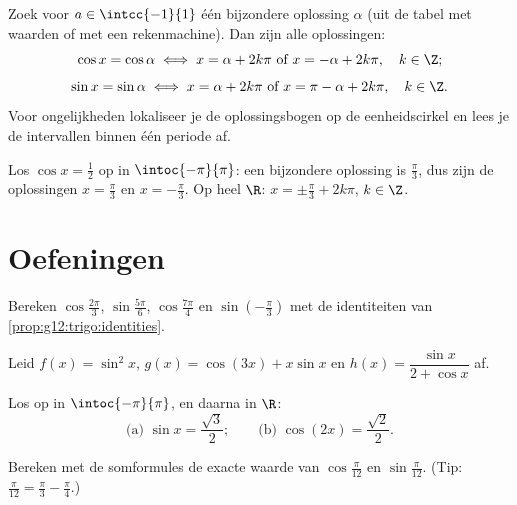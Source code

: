 \begin{method}[$\cos x = a$ en $\sin x = a$ oplossen]\label{met:g12:trigo:equations}
Zoek voor $a \in \intcc{-1}{1}$ één bijzondere oplossing $\alpha$ (uit de
tabel met waarden of met een rekenmachine). Dan zijn alle oplossingen:
\[
\cos x = \cos\alpha \iff x = \alpha + 2k\pi \text{ of } x = -\alpha + 2k\pi,
\quad k \in \Z;
\]
\[
\sin x = \sin\alpha \iff x = \alpha + 2k\pi \text{ of } x = \pi - \alpha + 2k\pi,
\quad k \in \Z.
\]
Voor ongelijkheden lokaliseer je de oplossingsbogen op de eenheidscirkel en
lees je de intervallen binnen één periode af.
\end{method}

\begin{example}\label{ex:g12:trigo:equation}
Los $\cos x = \frac12$ op in $\intoc{-\pi}{\pi}$: een bijzondere oplossing is
$\frac\pi3$, dus zijn de oplossingen $x = \frac\pi3$ en $x = -\frac\pi3$. Op
heel $\R$: $x = \pm\frac\pi3 + 2k\pi$, $k \in \Z$.
\end{example}

\section{Oefeningen}

\begin{exercise}[$\star$]\label{exo:g12:trigo:1}
Bereken $\cos\frac{2\pi}{3}$, $\sin\frac{5\pi}{6}$, $\cos\frac{7\pi}{4}$ en
$\sin\left(-\frac{\pi}{3}\right)$ met de identiteiten van
\cref{prop:g12:trigo:identities}.
\end{exercise}

\begin{exercise}[$\star$]\label{exo:g12:trigo:2}
Leid $f(x) = \sin^2 x$, $g(x) = \cos(3x) + x\sin x$ en
$h(x) = \dfrac{\sin x}{2 + \cos x}$ af.
\end{exercise}

\begin{exercise}[$\star$]\label{exo:g12:trigo:3}
Los op in $\intoc{-\pi}{\pi}$, en daarna in $\R$:
\[
\text{(a) } \sin x = \frac{\sqrt3}{2};
\qquad
\text{(b) } \cos\left(2x\right) = \frac{\sqrt2}{2} .
\]
\end{exercise}

\begin{exercise}[$\star\star$]\label{exo:g12:trigo:4}
Bereken met de somformules de exacte waarde van $\cos\frac{\pi}{12}$ en
$\sin\frac{\pi}{12}$. (Tip: $\frac{\pi}{12} = \frac{\pi}{3} -
\frac{\pi}{4}$.)
\end{exercise}

